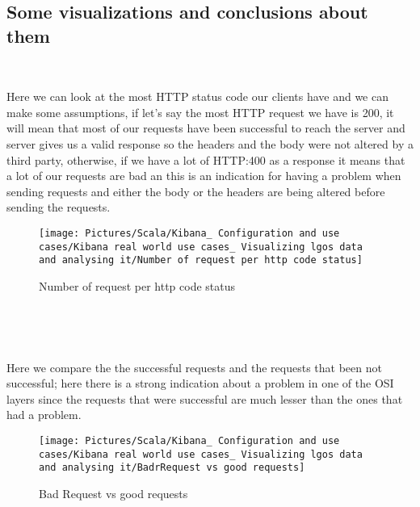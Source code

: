 \begin{spacing}{1.2}
\subsection{Some visualizations and conclusions about them }

\\
\par Here we can look at the most HTTP status code our clients have and we can make some assumptions, if let's say the most HTTP request we have is 200, it will mean that most of our requests have been successful to reach the server and server gives us a valid response so the headers and the body were not altered by a third party, otherwise, if we have a lot of HTTP:400 as a response it means that a lot of our requests are bad an this is an indication for having a problem when sending requests and either the body or the headers are being altered before sending the requests.
\\

\begin{figure}[!htb] 
\begin{center} 
\texttt{[image: Pictures/Scala/Kibana\_ Configuration and use cases/Kibana real world use cases\_ Visualizing lgos data and analysing it/Number of request per http code status]} 
\end{center} 
\caption{Number of request per http code status} 
\end{figure}  \FloatBarrier
\\

\newpage

\\
\par Here we compare the the successful requests and the requests that been not successful; here there is a strong indication about a problem in one of the OSI layers since the requests that were successful are much lesser than the ones that had a problem.
\\

\begin{figure}[!htb] 
\begin{center} 
\texttt{[image: Pictures/Scala/Kibana\_ Configuration and use cases/Kibana real world use cases\_ Visualizing lgos data and analysing it/BadrRequest vs good requests]} 
\end{center} 
\caption{Bad Request vs good requests} 
\end{figure}  \FloatBarrier
\\






\end{spacing}
